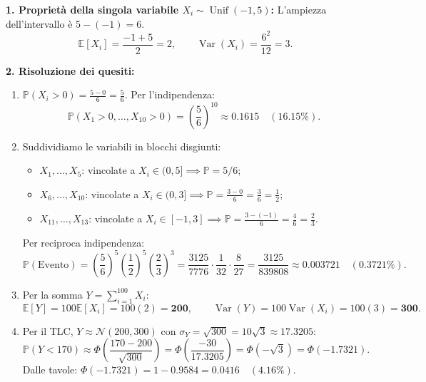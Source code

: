 \documentclass[11pt,a4paper]{article}
\newcommand{\EE}{\mathbb{E}}
\newcommand{\Prob}{\mathbb{P}}
\newcommand{\Var}{\operatorname{Var}}
\begin{document}
\begin{soluzionebox}
\textbf{1. Proprietà della singola variabile $X_i \sim \operatorname{Unif}(-1, 5)$:}
L'ampiezza dell'intervallo è $5 - (-1) = 6$.
\[
\EE[X_i] = \frac{-1 + 5}{2} = 2, \qquad \Var(X_i) = \frac{6^2}{12} = 3.
\]

\textbf{2. Risoluzione dei quesiti:}
\begin{enumerate}[label=(\alph*)]
    \item $\Prob(X_i > 0) = \frac{5 - 0}{6} = \frac{5}{6}$. Per l'indipendenza:
    \[
    \Prob(X_1 > 0, \dots, X_{10} > 0) = \left(\frac{5}{6}\right)^{10} \approx \mathbf{0.1615} \quad (\mathbf{16.15\%}).
    \]

    \item Suddividiamo le variabili in blocchi disgiunti:
    \begin{itemize}
        \item $X_1, \dots, X_5$: vincolate a $X_i \in (0, 5] \implies \Prob = 5/6$;
        \item $X_6, \dots, X_{10}$: vincolate a $X_i \in (0, 3] \implies \Prob = \frac{3 - 0}{6} = \frac{3}{6} = \frac{1}{2}$;
        \item $X_{11}, \dots, X_{13}$: vincolate a $X_i \in [-1, 3] \implies \Prob = \frac{3 - (-1)}{6} = \frac{4}{6} = \frac{2}{3}$.
    \end{itemize}
    Per reciproca indipendenza:
    \[
    \Prob(\text{Evento}) = \left(\frac{5}{6}\right)^5 \left(\frac{1}{2}\right)^5 \left(\frac{2}{3}\right)^3 = \frac{3125}{7776} \cdot \frac{1}{32} \cdot \frac{8}{27} = \frac{3125}{839808} \approx \mathbf{0.003721} \quad (\mathbf{0.3721\%}).
    \]

    \item Per la somma $Y = \sum_{i=1}^{100} X_i$:
    \[
    \EE[Y] = 100 \EE[X_i] = 100(2) = \mathbf{200}, \qquad \Var(Y) = 100 \Var(X_i) = 100(3) = \mathbf{300}.
    \]

    \item Per il TLC, $Y \approx \mathcal{N}(200, 300)$ con $\sigma_Y = \sqrt{300} = 10\sqrt{3} \approx 17.3205$:
    \[
    \Prob(Y < 170) \approx \Phi\left(\frac{170 - 200}{\sqrt{300}}\right) = \Phi\left(\frac{-30}{17.3205}\right) = \Phi(-\sqrt{3}) = \Phi(-1.7321).
    \]
    Dalle tavole: $\Phi(-1.7321) = 1 - 0.9584 = \mathbf{0.0416} \quad (\mathbf{4.16\%})$.
\end{enumerate}
\end{soluzionebox}
\end{document}
